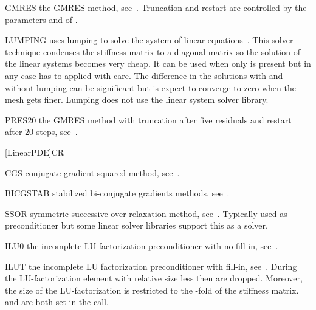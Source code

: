 \begin{memberdesc}[LinearPDE]{GMRES}
the GMRES method, see~. Truncation and restart are controlled by the parameters
 and  of .
\end{memberdesc}

\begin{memberdesc}[LinearPDE]{LUMPING}
uses lumping to solve the system of linear equations~. This solver technique 
condenses the stiffness matrix to a diagonal matrix so the solution of the linear systems becomes very cheap. It can be used when 
only  is present but in any case has to applied with care. The difference in the solutions with and without lumping can be significant
but is expect to converge to zero when the mesh gets finer.  
Lumping does not use the linear system solver library.   
\end{memberdesc}

\begin{memberdesc}[LinearPDE]{PRES20}
the GMRES method with truncation after five residuals and
restart after 20 steps, see~.
\end{memberdesc}[LinearPDE]{CR}

\begin{memberdesc}[LinearPDE]{CGS}
conjugate gradient squared method, see~.
\end{memberdesc}

\begin{memberdesc}[LinearPDE]{BICGSTAB}
stabilized bi-conjugate gradients methods, see~. 
\end{memberdesc}

\begin{memberdesc}[LinearPDE]{SSOR}
symmetric successive over-relaxation method, see~. Typically used as preconditioner but some linear solver libraries support
this as a solver.  
\end{memberdesc}
\begin{memberdesc}[LinearPDE]{ILU0}
the incomplete LU factorization preconditioner with no fill-in, see~. 
\end{memberdesc}

\begin{memberdesc}[LinearPDE]{ILUT}
the incomplete LU factorization preconditioner with fill-in, see~. During the  LU-factorization element with
relative size less then  are dropped. Moreover, the size of the LU-factorization is restricted to the
-fold of the stiffness matrix.  and  are both set in the 
 call. 
\end{memberdesc}

